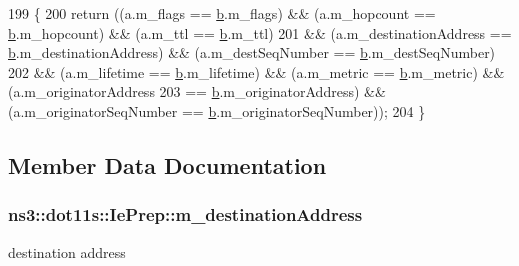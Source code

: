 \begin{DoxyCode}
199 \{
200   \textcolor{keywordflow}{return} ((a.m\_flags == \hyperlink{buildings__pathloss_8m_a21ad0bd836b90d08f4cf640b4c298e7c}{b}.m\_flags) && (a.m\_hopcount == \hyperlink{buildings__pathloss_8m_a21ad0bd836b90d08f4cf640b4c298e7c}{b}.m\_hopcount) && (a.m\_ttl == 
      \hyperlink{buildings__pathloss_8m_a21ad0bd836b90d08f4cf640b4c298e7c}{b}.m\_ttl)
201           && (a.m\_destinationAddress == \hyperlink{buildings__pathloss_8m_a21ad0bd836b90d08f4cf640b4c298e7c}{b}.m\_destinationAddress) && (a.m\_destSeqNumber == 
      \hyperlink{buildings__pathloss_8m_a21ad0bd836b90d08f4cf640b4c298e7c}{b}.m\_destSeqNumber)
202           && (a.m\_lifetime == \hyperlink{buildings__pathloss_8m_a21ad0bd836b90d08f4cf640b4c298e7c}{b}.m\_lifetime) && (a.m\_metric == \hyperlink{buildings__pathloss_8m_a21ad0bd836b90d08f4cf640b4c298e7c}{b}.m\_metric) && (a.m\_originatorAddress
203                                                                               == 
      \hyperlink{buildings__pathloss_8m_a21ad0bd836b90d08f4cf640b4c298e7c}{b}.m\_originatorAddress) && (a.m\_originatorSeqNumber == \hyperlink{buildings__pathloss_8m_a21ad0bd836b90d08f4cf640b4c298e7c}{b}.m\_originatorSeqNumber));
204 \}
\end{DoxyCode}


\subsection{Member Data Documentation}
\subsubsection[{\texorpdfstring{m\+\_\+destination\+Address}{m_destinationAddress}}]{ ns3\+::dot11s\+::\+Ie\+Prep\+::m\+\_\+destination\+Address\hspace{0.3cm}{\ttfamily [private]}}\hypertarget{classns3_1_1dot11s_1_1IePrep_ae91e8ddb71cc80a61cfe46af5b0311b5}{}\label{classns3_1_1dot11s_1_1IePrep_ae91e8ddb71cc80a61cfe46af5b0311b5}


destination address 

